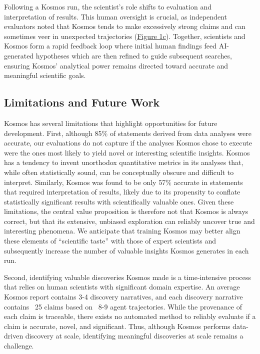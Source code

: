 \documentclass{article}
\begin{document}
Following a Kosmos run, the scientist’s role shifts to evaluation and interpretation of results. This human oversight is crucial, as independent evaluators noted that Kosmos tends to make excessively strong claims and can sometimes veer in unexpected trajectories (\hyperref[fig:fig1]{Figure 1c}). Together, scientists and Kosmos form a rapid feedback loop where initial human findings feed AI-generated hypotheses which are then refined to guide subsequent searches, ensuring Kosmos' analytical power remains directed toward accurate and meaningful scientific goals.

\subsection{Limitations and Future Work}

Kosmos has several limitations that highlight opportunities for future development. First, although 85\% of statements derived from data analyses were accurate, our evaluations do not capture if the analyses Kosmos chose to execute were the ones most likely to yield novel or interesting scientific insights. Kosmos has a tendency to invent unorthodox quantitative metrics in its analyses that, while often statistically sound, can be conceptually obscure and difficult to interpret. Similarly, Kosmos was found to be only 57\% accurate in statements that required interpretation of results, likely due to its propensity to conflate statistically significant results with scientifically valuable ones. Given these limitations, the central value proposition is therefore not that Kosmos is always correct, but that its extensive, unbiased exploration can reliably uncover true and interesting phenomena. We anticipate that training Kosmos may better align these elements of “scientific taste” with those of expert scientists and subsequently increase the number of valuable insights Kosmos generates in each run. 

Second, identifying valuable discoveries Kosmos made is a time-intensive process that relies on human scientists with significant domain expertise. An average Kosmos report contains 3-4 discovery narratives, and each discovery narrative contains ~25 claims based on ~8-9 agent trajectories. While the provenance of each claim is traceable, there exists no automated method to reliably evaluate if a claim is accurate, novel, and significant. Thus, although Kosmos performs data-driven discovery at scale, identifying meaningful discoveries at scale remains a challenge. 
\end{document}
